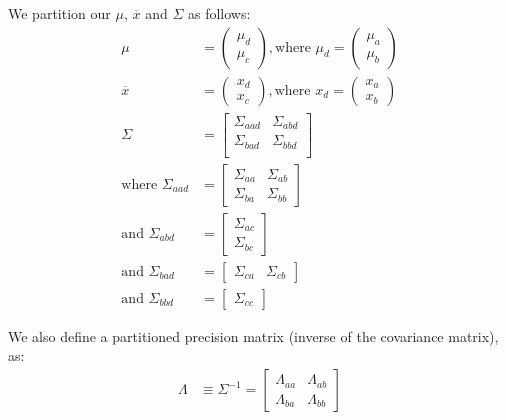 We partition our $\mu$, $\overline{x}$ and $\Sigma$ as follows:
\begin{align}
	\mu &= \begin{pmatrix}
		\mu_d \\
		\mu_c
	\end{pmatrix}, \text{where } \mu_d = \begin{pmatrix}\mu_a \\ \mu_b \end{pmatrix} \\
	\overline{x} &= \begin{pmatrix}
		x_d \\
		x_c
	\end{pmatrix}, \text{where } x_d = \begin{pmatrix}x_a \\ x_b \end{pmatrix} \\
	\Sigma &= \begin{bmatrix}
		\Sigma_{aad} & \Sigma_{abd} \\
		\Sigma_{bad} & \Sigma_{bbd} \\
	\end{bmatrix} \\
	\text{where } \Sigma_{aad} &= \begin{bmatrix}
		\Sigma_{aa} & \Sigma_{ab} \\
		\Sigma_{ba} & \Sigma_{bb}
	\end{bmatrix} \\
	\text{and } \Sigma_{abd} &= \begin{bmatrix}
		\Sigma_{ac} \\ \Sigma_{bc}
	\end{bmatrix} \\
	\text{and } \Sigma_{bad} &= \begin{bmatrix}
		\Sigma_{ca} & \Sigma_{cb} 
	\end{bmatrix} \\
	\text{and } \Sigma_{bbd} &= \begin{bmatrix} \Sigma_{cc} \end{bmatrix}
\end{align}

We also define a partitioned precision matrix 
(inverse of the covariance matrix), as:
\begin{align}
	\Lambda &\equiv \Sigma^{-1} = \begin{bmatrix}
		\Lambda_{aa} & \Lambda_{ab} \\
		\Lambda_{ba} & \Lambda_{bb}		
	\end{bmatrix}
\end{align}

